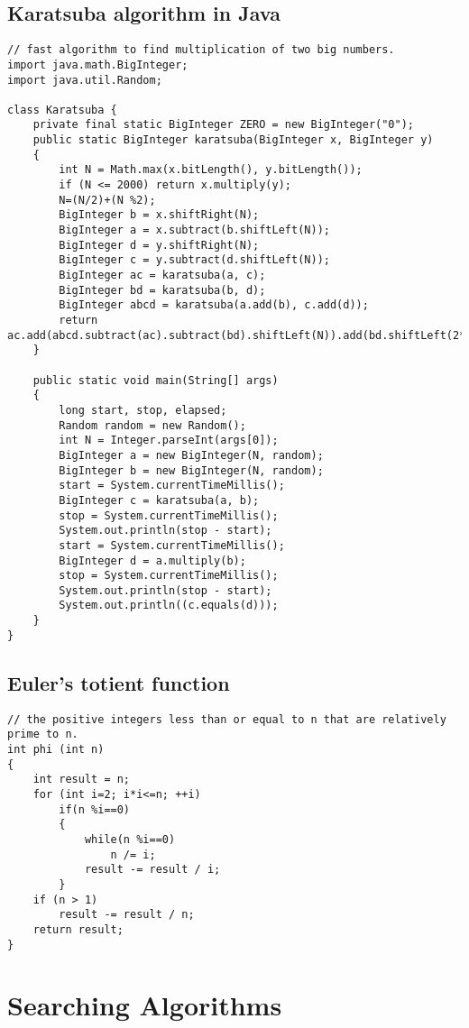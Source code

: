 \documentclass[a4paper]{article}
\begin{document}
\subsection{Karatsuba algorithm in Java}

\begin{verbatim}
// fast algorithm to find multiplication of two big numbers.
import java.math.BigInteger;
import java.util.Random;

class Karatsuba {
	private final static BigInteger ZERO = new BigInteger("0");
	public static BigInteger karatsuba(BigInteger x, BigInteger y)
	{
		int N = Math.max(x.bitLength(), y.bitLength());
		if (N <= 2000) return x.multiply(y);
		N=(N/2)+(N %2);
		BigInteger b = x.shiftRight(N);
		BigInteger a = x.subtract(b.shiftLeft(N));
		BigInteger d = y.shiftRight(N);
		BigInteger c = y.subtract(d.shiftLeft(N));
		BigInteger ac = karatsuba(a, c);
		BigInteger bd = karatsuba(b, d);
		BigInteger abcd = karatsuba(a.add(b), c.add(d));
		return ac.add(abcd.subtract(ac).subtract(bd).shiftLeft(N)).add(bd.shiftLeft(2*N));
	}
	
	public static void main(String[] args)
	{
		long start, stop, elapsed;
		Random random = new Random();
		int N = Integer.parseInt(args[0]);
		BigInteger a = new BigInteger(N, random);
		BigInteger b = new BigInteger(N, random);
		start = System.currentTimeMillis();
		BigInteger c = karatsuba(a, b);
		stop = System.currentTimeMillis();
		System.out.println(stop - start);
		start = System.currentTimeMillis();
		BigInteger d = a.multiply(b);
		stop = System.currentTimeMillis();
		System.out.println(stop - start);
		System.out.println((c.equals(d)));
	}
}
\end{verbatim}

\subsection{Euler's totient function}

\begin{verbatim}
// the positive integers less than or equal to n that are relatively prime to n.
int phi (int n)
{
	int result = n;
	for (int i=2; i*i<=n; ++i)
		if(n %i==0)
		{
			while(n %i==0)
				n /= i;
			result -= result / i;
		}
	if (n > 1)
		result -= result / n;
	return result;
}
\end{verbatim}

\section{Searching Algorithms}
\end{document}

